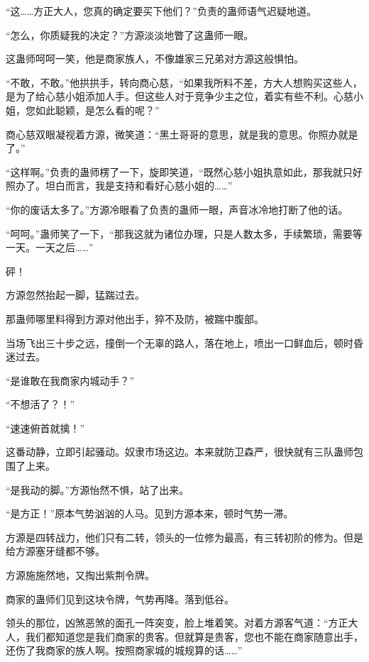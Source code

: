 
\begin{this_body}



“这……方正大人，您真的确定要买下他们？”负责的蛊师语气迟疑地道。

“怎么，你质疑我的决定？”方源淡淡地瞥了这蛊师一眼。

这蛊师呵呵一笑，他是商家族人，不像雄家三兄弟对方源这般惧怕。

“不敢，不敢。”他拱拱手，转向商心慈，“如果我所料不差，方大人想购买这些人，是为了给心慈小姐添加人手。但这些人对于竞争少主之位，着实有些不利。心慈小姐，您如此聪颖，是怎么看的呢？”

商心慈双眼凝视着方源，微笑道：“黑土哥哥的意思，就是我的意思。你照办就是了。”

“这样啊。”负责的蛊师楞了一下，旋即笑道，“既然心慈小姐执意如此，那我就只好照办了。坦白而言，我是支持和看好心慈小姐的……”

“你的废话太多了。”方源冷眼看了负责的蛊师一眼，声音冰冷地打断了他的话。

“呵呵。”蛊师笑了一下，“那我这就为诸位办理，只是人数太多，手续繁琐，需要等一天。一天之后……”

砰！

方源忽然抬起一脚，猛踹过去。

那蛊师哪里料得到方源对他出手，猝不及防，被踹中腹部。

当场飞出三十步之远，撞倒一个无辜的路人，落在地上，喷出一口鲜血后，顿时昏迷过去。

“是谁敢在我商家内城动手？”

“不想活了？！”

“速速俯首就擒！”

这番动静，立即引起骚动。奴隶市场这边。本来就防卫森严，很快就有三队蛊师包围了上来。

“是我动的脚。”方源怡然不惧，站了出来。

“是方正！”原本气势汹汹的人马。见到方源本来，顿时气势一滞。

方源是四转战力，他们只有二转，领头的一位修为最高，有三转初阶的修为。但是给方源塞牙缝都不够。

方源施施然地，又掏出紫荆令牌。

商家的蛊师们见到这块令牌，气势再降。落到低谷。

领头的那位，凶煞恶煞的面孔一阵突变，脸上堆着笑。对着方源客气道：“方正大人，我们都知道您是我们商家的贵客。但就算是贵客，您也不能在商家随意出手，还伤了我商家的族人啊。按照商家城的城规算的话……”


\end{this_body}

